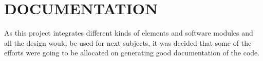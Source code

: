 \section{DOCUMENTATION}
As this project integrates different kinds of elements and software modules and all the design would be used for next subjects, it was decided that some of the efforts were going to be allocated on generating 
good documentation of the code.